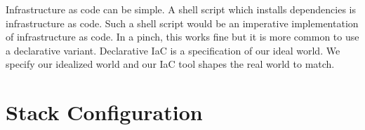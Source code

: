 Infrastructure as code can be simple.
A shell script which installs dependencies is infrastructure as code.
Such a shell script would be an imperative implementation of infrastructure as code.
In a pinch, this works fine but it is more common to use a declarative variant.
Declarative IaC is a specification of our ideal world.
We specify our idealized world and our IaC tool shapes the real world to match.

\section{Stack Configuration}

